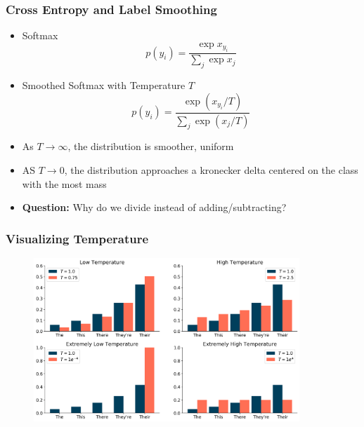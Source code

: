 \documentclass[usenames,dvipsnames]{beamer}
\begin{document}
\begin{frame}
\frametitle{Cross Entropy and Label Smoothing}
\begin{itemize}
  \item Softmax
  \begin{equation*}
    p(y_i) = \frac{\exp x_{y_i}}{\sum_j \exp x_j}
  \end{equation*}
  \item Smoothed Softmax with Temperature $T$
  \begin{equation*}
    p(y_i) = \frac{\exp \left(x_{y_i} / T \right)}{\sum_j \exp \left(x_j / T \right)}
  \end{equation*}
  \item As $T \to \infty$, the distribution is smoother, uniform
  \item AS $T \to 0$, the distribution approaches a kronecker delta centered on the class with the most mass
  \item \textbf{Question:} Why do we divide instead of adding/subtracting?
\end{itemize}
\end{frame}

\begin{frame}
\frametitle{Visualizing Temperature}
\begin{figure}
  \centering
  \includegraphics[width=10cm]{assets/temperature}
\end{figure}
\end{frame}

\end{document}
